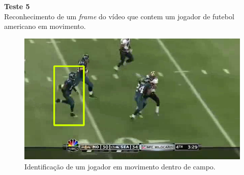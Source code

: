 \textbf{Teste 5}\\
Reconhecimento de um \textit{frame} do vídeo que contem um jogador de futebol americano em movimento.

\begin{figure}
    \centering
    \caption{Identificação de um jogador em movimento dentro de campo.}
    \includegraphics[scale=0.4]{05-SLIDES_DESENVOLVIMENTO/Etapa_de_Testes/imagens_testes/identificacao_jogador_em_movimento.png}
\end{figure}